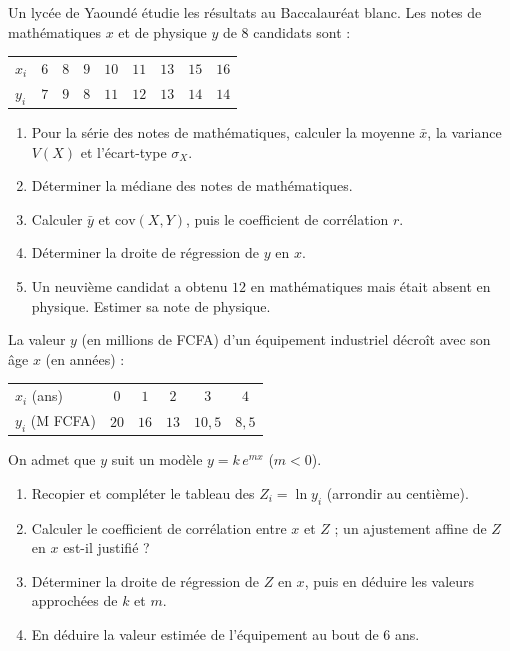 Un lycée de Yaoundé étudie les résultats au Baccalauréat blanc. Les notes de mathématiques
$x$ et de physique $y$ de $8$ candidats sont :
\begin{center}\small
\begin{tabular}{@{}lcccccccc@{}}
\toprule
$x_i$ & $6$ & $8$ & $9$ & $10$ & $11$ & $13$ & $15$ & $16$\\
$y_i$ & $7$ & $9$ & $8$ & $11$ & $12$ & $13$ & $14$ & $14$\\
\bottomrule
\end{tabular}
\end{center}
\begin{enumerate}[label=\arabic*)]
\item Pour la série des notes de mathématiques, calculer la moyenne $\bar x$, la variance
$V(X)$ et l'écart-type $\sigma_X$.
\item Déterminer la médiane des notes de mathématiques.
\item Calculer $\bar y$ et $\mathrm{cov}(X,Y)$, puis le coefficient de corrélation $r$.
\item Déterminer la droite de régression de $y$ en $x$.
\item Un neuvième candidat a obtenu $12$ en mathématiques mais était absent en physique.
Estimer sa note de physique.
\end{enumerate}

La valeur $y$ (en millions de FCFA) d'un équipement industriel décroît avec son âge $x$
(en années) :
\begin{center}\small
\begin{tabular}{@{}lccccc@{}}
\toprule
$x_i$ (ans) & $0$ & $1$ & $2$ & $3$ & $4$\\
$y_i$ (M FCFA) & $20$ & $16$ & $13$ & $10{,}5$ & $8{,}5$\\
\bottomrule
\end{tabular}
\end{center}
On admet que $y$ suit un modèle $y=k\,e^{mx}$ ($m<0$).
\begin{enumerate}[label=\arabic*)]
\item Recopier et compléter le tableau des $Z_i=\ln y_i$ (arrondir au centième).
\item Calculer le coefficient de corrélation entre $x$ et $Z$ ; un ajustement affine de $Z$
en $x$ est-il justifié ?
\item Déterminer la droite de régression de $Z$ en $x$, puis en déduire les valeurs
approchées de $k$ et $m$.
\item En déduire la valeur estimée de l'équipement au bout de $6$ ans.
\end{enumerate}


